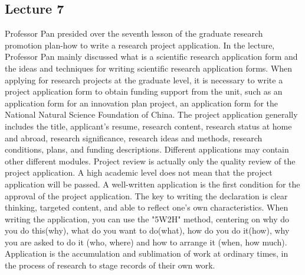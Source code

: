 \documentclass[UTF-8]{ctexart}
\begin{document}
\subsection{Lecture 7} 
Professor Pan presided over the seventh lesson of the graduate research promotion plan-how to write a research project application. In the lecture, Professor Pan mainly discussed what is a scientific research application form and the ideas and techniques for writing scientific research application forms.
When applying for research projects at the graduate level, it is necessary to write a project application form to obtain funding support from the unit, such as an application form for an innovation plan project, an application form for the National Natural Science Foundation of China. The project application generally includes the title, applicant's resume, research content, research status at home and abroad, research significance, research ideas and methods, research conditions, plans, and funding descriptions. Different applications may contain other different modules. Project review is actually only the quality review of the project application. A high academic level does not mean that the project application will be passed. A well-written application is the first condition for the approval of the project application.
The key to writing the declaration is clear thinking, targeted content, and able to reflect one's own characteristics. When writing the application, you can use the "5W2H" method, centering on why do you do this(why), what do you want to do(what), how do you do it(how), why you are asked to do it (who, where) and how to arrange it (when, how much). Application is the accumulation and sublimation of work at ordinary times, in the process of research to stage records of their own work.
\end{document}
